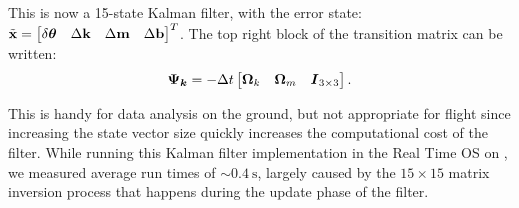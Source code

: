 This is now a 15-state Kalman filter, with the error state:
$\tilde{\textrm{\textbf{x}}} = \begin{bmatrix}\delta\boldsymbol\theta &\Delta\textbf{k}  &\Delta\textbf{m} &\Delta\textrm{\textbf{b}}\end{bmatrix}^T$. The top right block of the transition matrix can be written:
\begin{equation}
\boldsymbol{\Psi_k} = -\Delta t\begin{bmatrix}\boldsymbol{\Omega}_k&\boldsymbol{\Omega}_m & \boldsymbol{I}_{3\times 3}\end{bmatrix}.
\end{equation}

This is handy for data analysis on the ground, but not appropriate for flight since increasing the state vector size quickly increases the computational cost of the filter. While running this Kalman filter implementation in the Real Time OS on \boop, we measured average run times of $\sim\SI{0.4}{\second}$, largely caused by the $15\times 15$ matrix inversion process that happens during the update phase of the filter.

%
%

